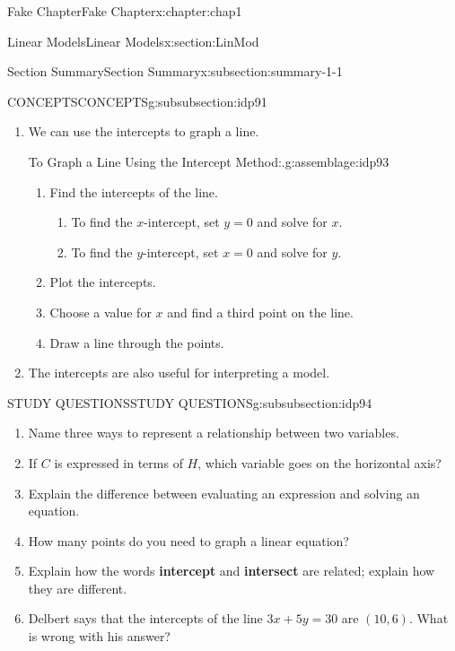 \documentclass[oneside,10pt,]{book}
\newcommand{\terminology}[1]{\textbf{#1}}
\numberwithin{equation}{section}
\begin{document}
\begin{chapterptx}{Fake Chapter}{}{Fake Chapter}{}{}{x:chapter:chap1}
\begin{sectionptx}{Linear Models}{}{Linear Models}{}{}{x:section:LinMod}
\begin{subsectionptx}{Section Summary}{}{Section Summary}{}{}{x:subsection:summary-1-1}
\begin{subsubsectionptx}{CONCEPTS}{}{CONCEPTS}{}{}{g:subsubsection:idp91}
\begin{enumerate}[label=\arabic*]
\item{}We can use the intercepts to graph a line.%
\par
%
\begin{assemblage}{To Graph a Line Using the Intercept Method:.}{g:assemblage:idp93}%
%
\begin{enumerate}[label=\arabic*]
\item{}Find the intercepts of the line.%
\begin{enumerate}[label=\alph*]
\item{}To find the \(x\)-intercept, set \(y=0\) and solve for \(x\).%
\item{}To find the \(y\)-intercept, set \(x=0\) and solve for \(y\).%
\end{enumerate}
%
\item{}Plot the intercepts.%
\item{}Choose a value for \(x\) and find a third point on the line.%
\item{}Draw a line through the points.%
\end{enumerate}
%
\end{assemblage}
\item{}The intercepts are also useful for interpreting a model.%
\end{enumerate}
%
\end{subsubsectionptx}
%
%
\typeout{************************************************}
\typeout{************************************************}
%
\begin{subsubsectionptx}{STUDY QUESTIONS}{}{STUDY QUESTIONS}{}{}{g:subsubsection:idp94}
%
\begin{enumerate}[label=\arabic*]
\item{}Name three ways to represent a relationship between two variables.%
\item{}If \(C\) is expressed in terms of \(H\), which variable goes on the horizontal axis?%
\item{}Explain the difference between evaluating an expression and solving an equation.%
\item{}How many points do you need to graph a linear equation?%
\item{}Explain how the words \terminology{intercept} and \terminology{intersect} are related; explain how they are different.%
\item{}Delbert says that the intercepts of the line \(3x + 5y = 30\) are \((10, 6)\). What is wrong with his answer?%
\end{enumerate}

\end{subsubsectionptx}
\end{subsectionptx}
\end{sectionptx}
\end{chapterptx}
\end{document}
